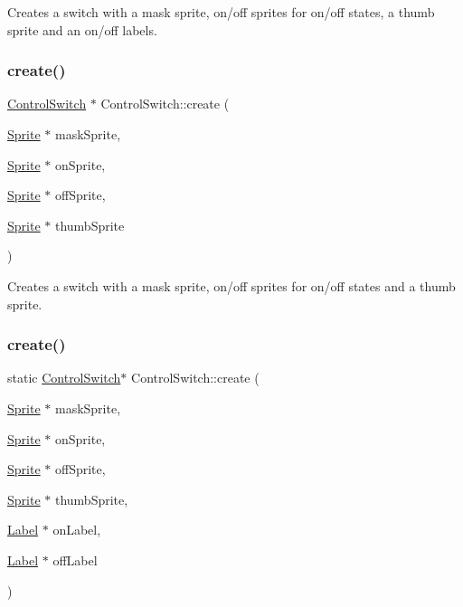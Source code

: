 Creates a switch with a mask sprite, on/off sprites for on/off states, a thumb sprite and an on/off labels. \mbox{\label{classControlSwitch_ad9eea6f59a69b426eefdad747484ed46}} 
\subsubsection{\texorpdfstring{create()}{create()}\hspace{0.1cm}{\footnotesize\ttfamily [2/4]}}
{\footnotesize\ttfamily \hyperlink{classControlSwitch}{Control\+Switch} $\ast$ Control\+Switch\+::create (\begin{DoxyParamCaption}\item[{\hyperlink{classSprite}{Sprite} $\ast$}]{mask\+Sprite,  }\item[{\hyperlink{classSprite}{Sprite} $\ast$}]{on\+Sprite,  }\item[{\hyperlink{classSprite}{Sprite} $\ast$}]{off\+Sprite,  }\item[{\hyperlink{classSprite}{Sprite} $\ast$}]{thumb\+Sprite }\end{DoxyParamCaption})\hspace{0.3cm}{\ttfamily [static]}}

Creates a switch with a mask sprite, on/off sprites for on/off states and a thumb sprite. \mbox{\label{classControlSwitch_aab9a6eb701755481f6e9128447c796b2}} 
\subsubsection{\texorpdfstring{create()}{create()}\hspace{0.1cm}{\footnotesize\ttfamily [3/4]}}
{\footnotesize\ttfamily static \hyperlink{classControlSwitch}{Control\+Switch}$\ast$ Control\+Switch\+::create (\begin{DoxyParamCaption}\item[{\hyperlink{classSprite}{Sprite} $\ast$}]{mask\+Sprite,  }\item[{\hyperlink{classSprite}{Sprite} $\ast$}]{on\+Sprite,  }\item[{\hyperlink{classSprite}{Sprite} $\ast$}]{off\+Sprite,  }\item[{\hyperlink{classSprite}{Sprite} $\ast$}]{thumb\+Sprite,  }\item[{\hyperlink{classLabel}{Label} $\ast$}]{on\+Label,  }\item[{\hyperlink{classLabel}{Label} $\ast$}]{off\+Label }\end{DoxyParamCaption})\hspace{0.3cm}{\ttfamily [static]}}

